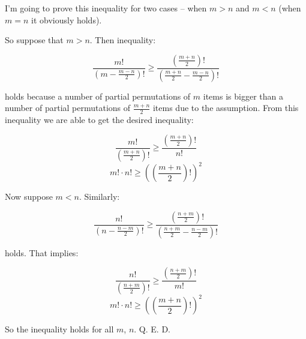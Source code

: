 \documentclass{fkssolpub}
\author{Ondřej Sedláček}
\begin{document}
I'm going to prove this inequality for two cases -- when $m > n$ and $m < n$ (when
$m = n$ it obviously holds).

So suppose that $m > n$. Then inequality:

\[
	\frac{m!}{\left(m - \frac{m - n}{2}\right)!} \geq \frac{\left(\frac{m + n}{2}\right)!}{\left(\frac{m + n}{2} - \frac{m - n}{2}\right)!}
\]

holds because a number of partial permutations of $m$ items is
bigger than a number of partial permutations of $\frac{m + n}{2}$ items due to the assumption.
From this inequality we are able to get the desired inequality:

\[
	\frac{m!}{\left(\frac{m + n}{2}\right)!} \geq \frac{\left(\frac{m + n}{2}\right)!}{n!}
\]
\[
	m! \cdot n! \geq \left(\left(\frac{m + n}{2}\right)!\right)^2
\]

Now suppose $m < n$. Similarly:

\[
	\frac{n!}{\left(n - \frac{n - m}{2}\right)!} \geq \frac{\left(\frac{n + m}{2}\right)!}{\left(\frac{n + m}{2} - \frac{n - m}{2}\right)!}
\]

holds. That implies:

\[
	\frac{n!}{\left(\frac{n + m}{2}\right)!} \geq \frac{\left(\frac{n + m}{2}\right)!}{m!}
\]
\[
	m! \cdot n! \geq \left(\left(\frac{m + n}{2}\right)!\right)^2
\]

So the inequality holds for all $m$, $n$. Q. E. D.
\end{document}
